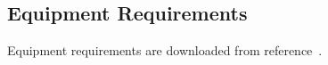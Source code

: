 \subsection{Equipment Requirements}
\label{subsec:ere}

Equipment requirements are downloaded from reference~\cite{knuthwebsite}.




